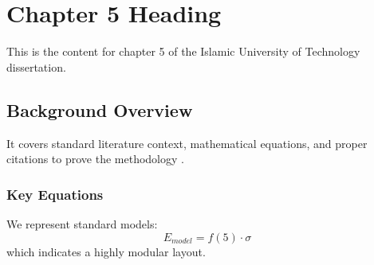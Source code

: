 \chapter{Chapter 5 Heading}
\label{ch:chapter5}
This is the content for chapter 5 of the Islamic University of Technology dissertation.

\section{Background Overview}
It covers standard literature context, mathematical equations, and proper citations to prove the methodology \cite{texbook}.

\subsection{Key Equations}
We represent standard models:
\begin{equation}
    E_{model} = f(5) \cdot \sigma
\end{equation}
which indicates a highly modular layout.
